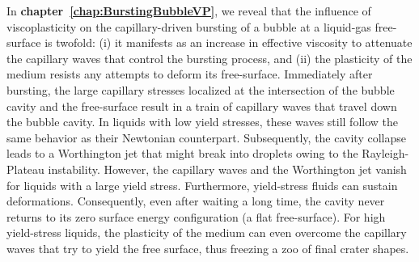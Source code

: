 In \textbf{chapter~\ref{chap:BurstingBubbleVP}}, we reveal that the influence of viscoplasticity on the capillary-driven bursting of a bubble at a liquid-gas free-surface is twofold: (i) it manifests as an increase in effective viscosity to attenuate the capillary waves that control the bursting process, and (ii) the plasticity of the medium resists any attempts to deform its free-surface. Immediately after bursting, the large capillary stresses localized at the intersection of the bubble cavity and the free-surface result in a train of capillary waves that travel down the bubble cavity. In liquids with low yield stresses, these waves still follow the same behavior as their Newtonian counterpart. Subsequently, the cavity collapse leads to a Worthington jet that might break into droplets owing to the Rayleigh-Plateau instability. However, the capillary waves and the Worthington jet vanish for liquids with a large yield stress. Furthermore, yield-stress fluids can sustain deformations. Consequently, even after waiting a long time, the cavity never returns to its zero surface energy configuration (a flat free-surface). For high yield-stress liquids, the plasticity of the medium can even overcome the capillary waves that try to yield the free surface, thus freezing a zoo of final crater shapes. 
